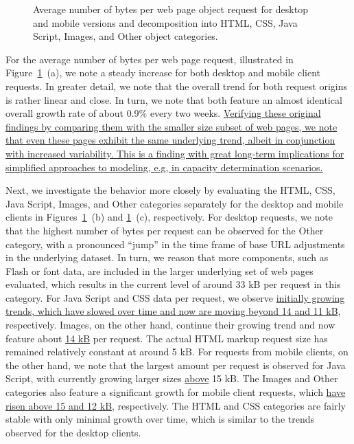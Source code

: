 \documentclass[onecolumn,12pt]{IEEEtran}
\begin{document}
\begin{figure}
	\caption{Average number of bytes per web page object request for desktop and mobile versions and decomposition into  HTML, CSS, Java Script, Images, and Other object categories.\label{fig:relative}}
\end{figure}
For the average number of bytes per web page request, illustrated in Figure~\ref{fig:relative}~(a), we note a steady increase for both desktop and mobile client requests. 
In greater detail, we note that the overall trend for both request origins is rather linear and close.
In turn, we note that both feature an almost identical overall growth rate of about 0.9\% every two weeks.
\uline{Verifying these original findings by comparing them with the smaller size subset of web pages, we note that even these pages exhibit the same underlying trend, albeit in conjunction with increased variability.
	This is a finding with great long-term implications for simplified approaches to modeling, e.g, in capacity determination scenarios.}

Next, we investigate the behavior more closely by evaluating the HTML, CSS, Java Script, Images, and Other categories separately for the desktop and mobile clients in Figures~\ref{fig:relative}~(b) and \ref{fig:relative}~(c), respectively.
For desktop requests, we note that the highest number of bytes per request can be observed for the Other category, with a pronounced ``jump'' in the time frame of base URL adjustments in the underlying dataset. 
In turn, we reason that more components, such as Flash or font data, are included in the larger underlying set of web pages evaluated, which results in the current level of around 33 kB per request in this category.
For Java Script and CSS data per request, we observe  \uline{initially growing trends, which have slowed over time and now are moving beyond 14 and 11 kB}, respectively.
Images, on the other hand, continue their growing trend and now feature about \uline{14 kB} per request.
The actual HTML markup request size has remained relatively constant at around 5 kB.
For requests from mobile clients, on the other hand, we note that the largest amount per request is observed for Java Script, with currently growing larger sizes \uline{above} 15 kB.
The Images and Other categories also feature a significant growth for mobile client requests, which \uline{have risen above 15 and 12 kB}, respectively.
The HTML and CSS categories are fairly stable with only minimal growth over time, which is similar to the trends observed for the desktop clients.
\end{document}
